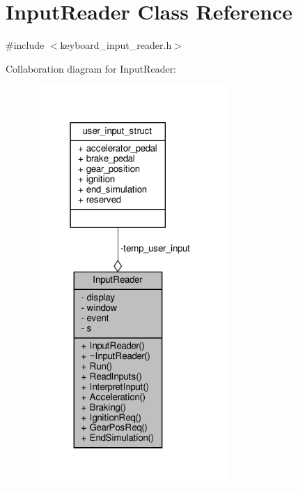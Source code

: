\hypertarget{classInputReader}{}\section{Input\+Reader Class Reference}
\label{classInputReader}


{\ttfamily \#include $<$keyboard\+\_\+input\+\_\+reader.\+h$>$}



Collaboration diagram for Input\+Reader\+:
\nopagebreak
\begin{figure}[H]
\begin{center}
\leavevmode
\includegraphics[width=210pt]{classInputReader__coll__graph}
\end{center}
\end{figure}
